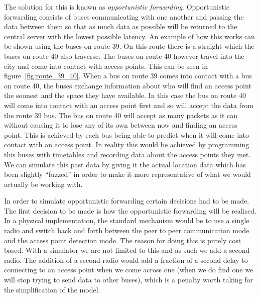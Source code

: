         The solution for this is known as \emph{opportunistic forwarding}. Opportunistic forwarding consists of buses communicating with one another and passing the data between them so that as much data as possible will be returned to the central server with the lowest possible latency. An example of how this works can be shown using the buses on route 39. On this route there is a straight which the buses on route 40 also traverse. The buses on route 40 however travel into the city and come into contact with access points. This can be seen in figure~\ref{fig:route_39_40}. When a bus on route 39 comes into contact with a bus on route 40, the buses exchange information about who will find an access point the soonest and the space they have available. In this case the bus on route 40 will come into contact with an access point first and so will accept the data from the route 39 bus. The bus on route 40 will accept as many packets as it can without causing it to lose any of its own between now and finding an access point. This is achieved by each bus being able to predict when it will come into contact with an access point. In reality this would be achieved by programming this buses with timetables and recording data about the access points they met. We can simulate this past data by giving it the actual location data which has been slightly ``fuzzed'' in order to make it more representative of what we would actually be working with. 


        In order to simulate opportunistic forwarding certain decisions had to be made.  The first decision to be made is how the opportunistic forwarding will be realised. In a physical implementation, the standard mechanism would be to use a single radio and switch back and forth between the peer to peer communication mode and the access point detection mode. The reason for doing this is purely cost based. With a simulator we are not limited to this and as such we add a second radio. The addition of a second radio would add a fraction of a second delay to connecting to an access point when we come across one (when we do find one we will stop trying to send data to other buses), which is a penalty worth taking for the simplification of the model. 

